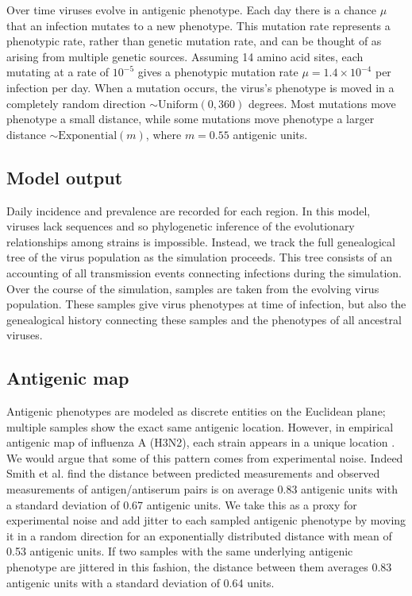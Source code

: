 \documentclass[11pt,oneside,letterpaper]{article}
\begin{document}
Over time viruses evolve in antigenic phenotype.  Each day there is a chance $\mu$ that an infection mutates to a new phenotype.  This mutation rate represents a phenotypic rate, rather than genetic mutation rate, and can be thought of as arising from multiple genetic sources.  Assuming 14 amino acid sites, each mutating at a rate of $10^{-5}$ gives a phenotypic mutation rate $\mu = 1.4 \times 10^{-4}$ per infection per day.  When a mutation occurs, the virus's phenotype is moved in a completely random direction $\sim \textrm{Uniform}(0,360)$ degrees.  Most mutations move phenotype a small distance, while some mutations move phenotype a larger distance $\sim \textrm{Exponential}(m)$, where $m = 0.55$ antigenic units.

\subsection*{Model output}

Daily incidence and prevalence are recorded for each region.  In this model, viruses lack sequences and so phylogenetic inference of the evolutionary relationships among strains is impossible.  Instead, we track the full genealogical tree of the virus population as the simulation proceeds.  This tree consists of an accounting of all transmission events connecting infections during the simulation.  Over the course of the simulation, samples are taken from the evolving virus population.  These samples give virus phenotypes at time of infection, but also the genealogical history connecting these samples and the phenotypes of all ancestral viruses.

\subsection*{Antigenic map}

Antigenic phenotypes are modeled as discrete entities on the Euclidean plane; multiple samples show the exact same antigenic location.  However, in empirical antigenic map of influenza A (H3N2), each strain appears in a unique location \cite{Smith04}.  We would argue that some of this pattern comes from experimental noise.  Indeed Smith et al. \cite{Smith04} find the distance between predicted measurements and observed measurements of antigen/antiserum pairs is on average 0.83 antigenic units with a standard deviation of 0.67 antigenic units.  We take this as a proxy for experimental noise and add jitter to each sampled antigenic phenotype by moving it in a random direction for an exponentially distributed distance with mean of 0.53 antigenic units.  If two samples with the same underlying antigenic phenotype are jittered in this fashion, the distance between them averages 0.83 antigenic units with a standard deviation of 0.64 units.
\end{document}
